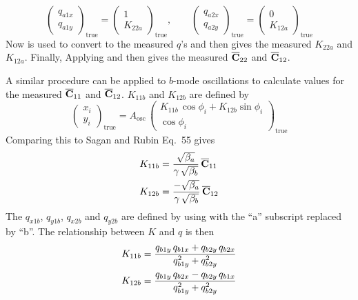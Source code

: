 \begin{equation}
  \begin{pmatrix}
    q_{a1x} \\
    q_{a1y}
  \end{pmatrix}_{\text{true}}
  =
  \begin{pmatrix}
    1 \\
    K_{22a}
  \end{pmatrix}_{\text{true}}
  \comma \qquad
  \begin{pmatrix}
    q_{a2x} \\
    q_{a2y}
  \end{pmatrix}_{\text{true}}
  =
  \begin{pmatrix}
    0 \\
    K_{12a}
  \end{pmatrix}_{\text{true}}
\end{equation}
Now  is used to convert to the measured $q$'s and
 then gives the measured $K_{22a}$ and $K_{12a}$. Finally,
Applying  and then  gives the measured
$\overline{{\bf C}}_{22}$ and $\overline{{\bf C}}_{12}$. 

A similar procedure can be applied to $b$-mode oscillations to
calculate values for the measured $\overline{{\bf C}}_{11}$ and $\overline{{\bf C}}_{12}$.
$K_{11b}$ and $K_{12b}$ are defined by
\begin{equation}
  \begin{pmatrix}
    x_i \\
    y_i
  \end{pmatrix}_{\! \text{true}}
  =
  A_{\text{osc}} \,
  \begin{pmatrix}
    K_{11b} \, \cos \phi_i + K_{12b} \sin \phi_i \\
    \cos \phi_i
  \end{pmatrix}_{\! \text{true}}
  \label{xyakp}
\end{equation}
Comparing this to Sagan and Rubin\cite{b:coupling} Eq.~55 gives
\begin{alignat}{1}
  K_{11b} &= \frac{ \sqrt{\beta_a}}{\gamma \, \sqrt{\beta_b}} \, \overline{{\bf C}}_{11} \nonumber \\
  K_{12b} &= \frac{-\sqrt{\beta_a}}{\gamma \, \sqrt{\beta_b}} \, \overline{{\bf C}}_{12}
  \label{kbbgbc}
\end{alignat}
The $q_{x1b}$, $q_{y1b}$, $q_{x2b}$ and $q_{y2b}$ are defined by using
 with the ``a'' subscript replaced by ``b''. The
relationship between $K$ and $q$ is then
\begin{alignat}{1}
  K_{11b} &= \frac{q_{b1y} \, q_{b1x} + q_{b2y} \, q_{b2x}}{q_{b1y}^2 + q_{b2y}^2} \nonumber \\
  K_{12b} &= \frac{q_{b1y} \, q_{b2x} - q_{b2y} \, q_{b1x}}{q_{b1y}^2 + q_{b2y}^2} 
  \label{kbqqqq}
\end{alignat}


